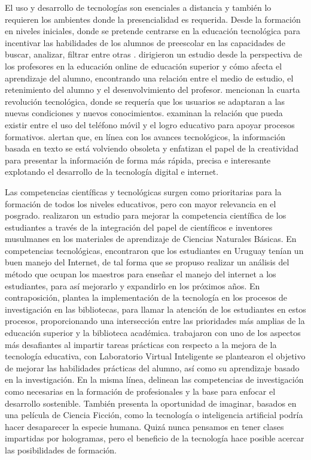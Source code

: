 \documentclass{textolivre}
\begin{document}
El uso y desarrollo de tecnologías son esenciales a distancia y también lo requieren los ambientes donde la presencialidad es requerida.  Desde la formación en niveles iniciales, donde se pretende centrarse en la educación tecnológica para incentivar las habilidades de los alumnos de preescolar en las capacidades de buscar, analizar, filtrar entre otras \cite{ferres_three_2018}. \textcite{lee_study_2018} dirigieron un estudio desde la perspectiva de los profesores en la educación online de educación superior y cómo afecta el aprendizaje del alumno, encontrando una relación entre el medio de estudio, el retenimiento del alumno y el desenvolvimiento del profesor. \textcite{milic_implementation_2017} mencionan la cuarta revolución tecnológica, donde se requería que los usuarios se adaptaran a las nuevas condiciones y nuevos conocimientos. \textcite{kates_effects_2018} examinan la relación que pueda existir entre el uso del teléfono móvil y el logro educativo para apoyar procesos formativos. \textcite{sudiartha_bandwidth_2018} alertan que, en línea con los avances tecnológicos, la información basada en texto se está volviendo obsoleta y enfatizan el papel de la creatividad para presentar la información de forma más rápida, precisa e interesante explotando el desarrollo de la tecnología digital e internet.

Las competencias científicas y tecnológicas surgen como prioritarias para la formación de todos los niveles educativos, pero con mayor relevancia en el posgrado. \textcite{mardiana_development_2018} realizaron un estudio para mejorar la competencia científica de los estudiantes a través de la integración del papel de científicos e inventores musulmanes en los materiales de aprendizaje de Ciencias Naturales Básicas. En competencias tecnológicas, \textcite{mateu_plan_2018} encontraron que los estudiantes en Uruguay tenían un buen manejo del Internet, de tal forma que se propuso realizar un análisis del método que ocupan los maestros para enseñar el manejo del internet a los estudiantes, para así mejorarlo y expandirlo en los próximos años. En contraposición, \textcite{todorinova_mixed-method_2018} plantea la implementación de la tecnología en los procesos de investigación en las bibliotecas, para llamar la atención de los estudiantes en estos procesos, proporcionando una intersección entre las prioridades más amplias de la educación superior y la biblioteca académica. \textcite{munawar_move_2018} trabajaron con uno de los aspectos más desafiantes al impartir tareas prácticas con respecto a la mejora de la tecnología educativa, con Laboratorio Virtual Inteligente se plantearon el objetivo de mejorar las habilidades prácticas del alumno, así como su aprendizaje basado en la investigación. En la misma línea, \textcite{castillo-martinez_research_2021} delinean las competencias de investigación como necesarias en la formación de profesionales y la base para enfocar el desarrollo sostenible. También \textcite{gonzalez_concepcion_2017} presenta la oportunidad de imaginar, basados en una película de Ciencia Ficción, como la tecnología o inteligencia artificial podría hacer desaparecer la especie humana. Quizá nunca pensamos en tener clases impartidas por hologramas, pero el beneficio de la tecnología hace posible acercar las posibilidades de formación.
\end{document}

